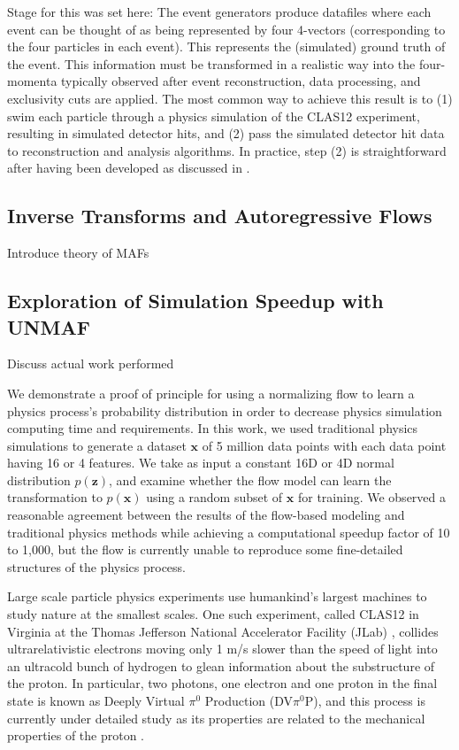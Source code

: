 
Stage for this was set here: The event generators produce datafiles where each event can be thought of as being represented by four 4-vectors (corresponding to the four particles in each event). This represents the (simulated) ground truth of the event. This information must be transformed in a realistic way into the four-momenta typically observed after event reconstruction, data processing, and exclusivity cuts are applied. The most common way to achieve this result is to (1) swim each particle through a physics simulation of the CLAS12 experiment, resulting in simulated detector hits, and (2) pass the simulated detector hit data to reconstruction and analysis algorithms. In practice, step (2) is straightforward after having been developed as discussed in .



\subsection{Inverse Transforms and Autoregressive Flows}
    Introduce theory of MAFs

\subsection{Exploration of Simulation Speedup with UNMAF}
    Discuss actual work performed

    

We demonstrate a proof of principle for using a normalizing flow to learn a physics process's probability distribution in order to decrease physics simulation computing time and requirements. In this work, we used traditional physics simulations to generate a dataset $\mathbf{x}$ of 5 million data points with each data point having 16 or 4 features.  We take as input a constant 16D or 4D normal distribution $p(\mathbf{z})$, and examine whether the flow model can learn the transformation to $p(\mathbf{x})$ using a random subset of $\mathbf{x}$ for training. We observed a reasonable agreement between the results of the flow-based modeling and traditional physics methods while achieving a computational speedup factor of 10 to 1,000, but the flow is currently unable to reproduce some fine-detailed structures of the physics process.



Large scale particle physics experiments use humankind's largest machines to study nature at the smallest scales. One such experiment, called CLAS12 in Virginia at the Thomas Jefferson National Accelerator Facility (JLab) \cite{BURKERT2020163419}, collides ultrarelativistic electrons moving only 1 m/s slower than the speed of light into an ultracold bunch of hydrogen to glean information about the substructure of the proton. In particular, two photons, one electron and one proton in the final state is known as Deeply Virtual $\pi^0$ Production (DV$\pi^0$P), and this process is currently under detailed study as its properties are related to the mechanical properties of the proton \cite{PhysRevD.55.7114}.

